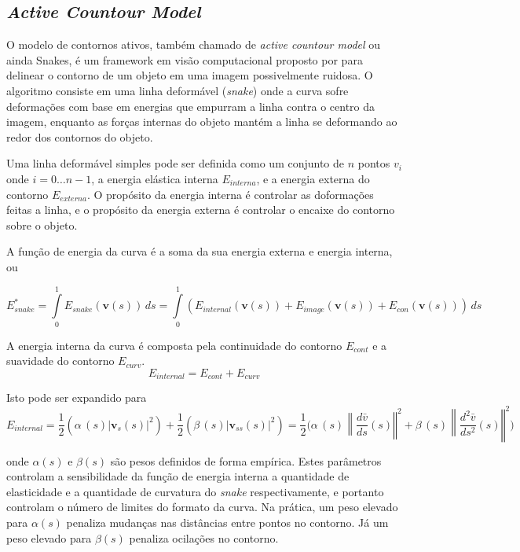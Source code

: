 \documentclass[12pt,oneside,a4paper,english,french,spanish,brazil,]{abntex2}
\begin{document}
\subsection{\textit{Active Countour Model}}

O modelo de contornos ativos, também chamado de \textit{active countour model} ou ainda Snakes, é um framework em visão computacional proposto por \citet{kass:1988} para delinear o contorno de um objeto em uma imagem possivelmente ruidosa. O algoritmo consiste em uma linha deformável (\textit{snake}) onde a curva sofre deformações com base em energias que empurram a linha contra o centro da imagem, enquanto as forças internas do objeto mantém a linha se deformando ao redor dos contornos do objeto. 

Uma linha deformável simples pode ser definida como um conjunto de \(n\) pontos \({v} _{i}\) onde \(i=0\ldots n-1\), a energia elástica interna \(E_{interna}\), e a energia externa do contorno \(E_{externa}\). O propósito da energia interna é controlar as doformações feitas a linha, e o propósito da energia externa é controlar o encaixe do contorno sobre o objeto. 

A função de energia da curva é a soma da sua energia externa e energia interna, ou

\[E_{snake}^{*}=\int \limits _{0}^{1}E_{snake}(\mathbf {v} (s))\,ds=\int \limits _{0}^{1}(E_{internal}(\mathbf {v} (s))+E_{image}(\mathbf {v} (s))+E_{con}(\mathbf {v} (s)))\,ds\]

A energia interna da curva é composta pela continuidade do contorno \(E_{cont}\) e a suavidade do contorno \(E_{curv}\).
\[E_{internal}=E_{cont}+E_{curv}\]
 
Isto pode ser expandido para 
\[ E_{internal}={\frac {1}{2}}(\alpha \,\!(s)\left|\mathbf {v} _{s}(s)\right\vert ^{2})+{\frac {1}{2}}(\beta \,\!(s)\left|\mathbf {v} _{ss}(s)\right\vert ^{2})={\frac {1}{2}}{\bigg (}\alpha \,\!(s)\left\|{\frac {d{\bar {v}}}{ds}}(s)\right\Vert ^{2}+\beta \,\!(s)\left\|{\frac {d^{2}{\bar {v}}}{ds^{2}}}(s)\right\Vert ^{2}{\bigg )}\]

onde \(\alpha (s)\) e \(\beta (s)\) são pesos definidos de forma empírica. Estes parâmetros controlam a sensibilidade da função de energia interna a quantidade de elasticidade e a quantidade de curvatura do \textit{snake} respectivamente, e portanto controlam o número de limites do formato da curva. Na prática, um peso elevado para \(\alpha (s)\) penaliza mudanças nas distâncias entre pontos no contorno. Já um peso elevado para \(\beta (s)\) penaliza ocilações no contorno.
\end{document}
